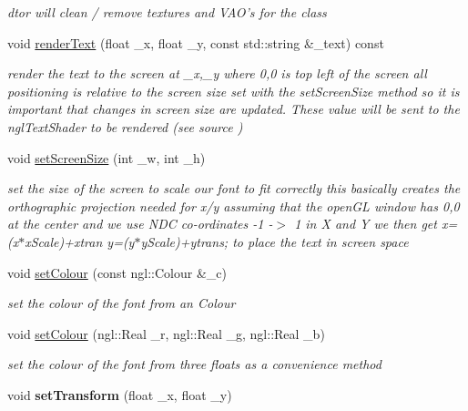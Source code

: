 \begin{DoxyCompactItemize}
\begin{DoxyCompactList}\small\item\em dtor will clean / remove textures and VAO's for the class \item\end{DoxyCompactList}\item 
void \hyperlink{classText_a3d0591d0b3a6bd73543cb8637fbe91e5}{renderText} (float \_\-x, float \_\-y, const std::string \&\_\-text) const 
\begin{DoxyCompactList}\small\item\em render the text to the screen at \_\-x,\_\-y where 0,0 is top left of the screen all positioning is relative to the screen size set with the setScreenSize method so it is important that changes in screen size are updated. These value will be sent to the nglTextShader to be rendered (see source ) \item\end{DoxyCompactList}\item 
void \hyperlink{classText_adf20a23bc781824e83dc50c121f56aea}{setScreenSize} (int \_\-w, int \_\-h)
\begin{DoxyCompactList}\small\item\em set the size of the screen to scale our font to fit correctly this basically creates the orthographic projection needed for x/y assuming that the openGL window has 0,0 at the center and we use NDC co-\/ordinates -\/1 -\/$>$ 1 in X and Y we then get x=(x$\ast$xScale)+xtran y=(y$\ast$yScale)+ytrans; to place the text in screen space \item\end{DoxyCompactList}\item 
void \hyperlink{classText_ad898e1ff3c2221029c115ed5de7f1b72}{setColour} (const ngl::Colour \&\_\-c)
\begin{DoxyCompactList}\small\item\em set the colour of the font from an Colour \item\end{DoxyCompactList}\item 
void \hyperlink{classText_ae2ce0fc28fdfccc2842487d5be64e12a}{setColour} (ngl::Real \_\-r, ngl::Real \_\-g, ngl::Real \_\-b)
\begin{DoxyCompactList}\small\item\em set the colour of the font from three floats as a convenience method \item\end{DoxyCompactList}\item 
\hypertarget{classText_a6ec9d77b284824829150b8ebb436c358}{
void {\bfseries setTransform} (float \_\-x, float \_\-y)}
\label{classText_a6ec9d77b284824829150b8ebb436c358}

\end{DoxyCompactItemize}


